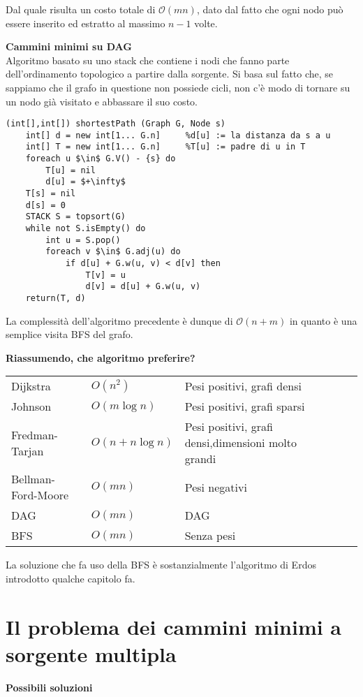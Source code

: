 \documentclass[../cheatSheetAlgoritmi.tex]{subfiles}
\begin{document}
\bigskip
Dal quale risulta un costo totale di $\mathcal{O}(mn)$, dato dal fatto che ogni nodo può essere inserito ed estratto al massimo $n-1$ volte.

\newpage
\textbf{Cammini minimi su DAG} \\
Algoritmo basato su uno stack che contiene i nodi che fanno parte dell'ordinamento topologico a partire dalla sorgente. Si basa sul fatto che, se sappiamo che il grafo in questione non possiede cicli, non c'è modo di tornare su un nodo già visitato e abbassare il suo costo.
\begin{lstlisting}[caption=Algoritmo per i DAG: cammini minimi a sorgente singola]
(int[],int[]) shortestPath (Graph G, Node s)
	int[] d = new int[1... G.n]		%d[u] := la distanza da s a u 
	int[] T = new int[1... G.n]		%T[u] := padre di u in T
	foreach u $\in$ G.V() - {s} do
		T[u] = nil
		d[u] = $+\infty$
	T[s] = nil
	d[s] = 0
	STACK S = topsort(G)
	while not S.isEmpty() do 
		int u = S.pop()
		foreach v $\in$ G.adj(u) do
			if d[u] + G.w(u, v) < d[v] then 
				T[v] = u 
				d[v] = d[u] + G.w(u, v)
	return(T, d)
\end{lstlisting}
La complessità dell'algoritmo precedente è dunque di $\mathcal{O}(n + m)$ in quanto è una semplice visita BFS del grafo.

\bigskip
\textbf{Riassumendo, che algoritmo preferire?}

\bigskip
\begin{tabular}{lllll}
Dijkstra       &  $O(n^2)$ & Pesi positivi, grafi densi &  \\
Johnson        &  $O(m \log n)$ &  Pesi positivi, grafi sparsi &  \\
Fredman-Tarjan &  $O(n + n \log n)$ & Pesi positivi, grafi densi,dimensioni molto grandi  & \\
Bellman-Ford-Moore &  $O(mn)$ & Pesi negativi &  \\
DAG               & $O(mn)$ & DAG  &  \\
BFS	 & $O(mn)$ & Senza pesi &  \\
\end{tabular}

\bigskip
La soluzione che fa uso della BFS è sostanzialmente l'algoritmo di Erdos introdotto qualche capitolo fa.

\section{Il problema dei cammini minimi a sorgente multipla}
\textbf{Possibili soluzioni}
\end{document}

